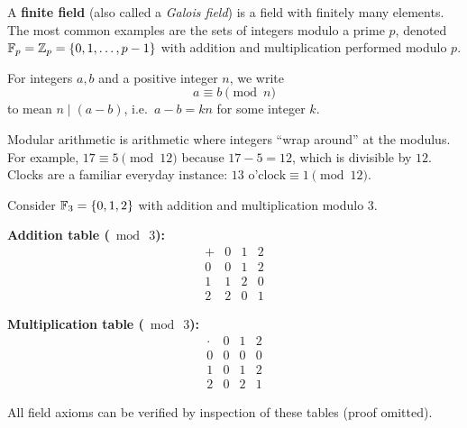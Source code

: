 \begin{defbox}
A \textbf{finite field} (also called a \emph{Galois field}) is a field with
finitely many elements.  The most common examples are the sets of integers
modulo a prime $p$, denoted $\mathbb{F}_p = \mathbb{Z}_p = \{0,1,\ldots,p-1\}$ with addition
and multiplication performed modulo $p$.
\end{defbox}

\begin{defbox}
For integers $a,b$ and a positive integer $n$, we write
\[
    a \equiv b \pmod{n}
\]
to mean $n \mid (a-b)$, i.e.\ $a - b = kn$ for some integer $k$.
\end{defbox}

\begin{tipbox}
Modular arithmetic is arithmetic where integers ``wrap around'' at the modulus.
For example, $17 \equiv 5 \pmod{12}$ because $17-5=12$, which is divisible by
$12$.  Clocks are a familiar everyday instance: $13\text{ o'clock} \equiv 1
\pmod{12}$.
\end{tipbox}

\begin{exbox}
Consider $\mathbb{F}_3 = \{0,1,2\}$ with addition and multiplication modulo $3$.

\medskip
\textbf{Addition table ($\bmod\ 3$):}
\[
\begin{array}{c|ccc}
+ & 0 & 1 & 2 \\\hline
0 & 0 & 1 & 2 \\
1 & 1 & 2 & 0 \\
2 & 2 & 0 & 1
\end{array}
\]

\medskip
\textbf{Multiplication table ($\bmod\ 3$):}
\[
\begin{array}{c|ccc}
\cdot & 0 & 1 & 2 \\\hline
0     & 0 & 0 & 0 \\
1     & 0 & 1 & 2 \\
2     & 0 & 2 & 1
\end{array}
\]

All field axioms can be verified by inspection of these tables (proof omitted).
\end{exbox}

